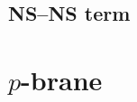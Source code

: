 \documentclass[a4paper,11pt]{article}
\begin{document}
\subsection{NS--NS term}
\label{sec:bos-str-nsns}


\section{$p$-brane}
\label{sec:p-bra}

\cite{Anciaux2010}

\printbibliography
\end{document}
